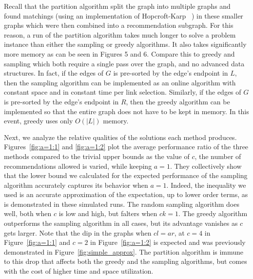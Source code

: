 Recall that the partition algorithm split the graph into multiple graphs
and found matchings (using an implementation of Hopcroft-Karp ~\cite{HopcroftKarp})
in these smaller graphs which were then combined into
a recommendation subgraph. For this reason, a run of the partition
algorithm takes much longer to solve a problem instance than either the
sampling or greedy algorithms. It also takes significantly more memory as can be seen in Figures 5 and 6.
Compare this to greedy and sampling which both require a single pass over
the graph, and no advanced data structures. In fact, if the edges
of $G$ is pre-sorted by the edge's endpoint in $L$, then the sampling algorithm can be
implemented as an online algorithm with constant space and in constant time
per link selection. Similarly, if the edges of $G$
is pre-sorted by the edge's endpoint in $R$, then the greedy algorithm can
be implemented so that the entire graph does not have to be kept in memory. In this
event, greedy uses only $O(|L|)$ memory. \vs

Next, we analyze the relative qualities of the solutions each method
produces.  Figures~\ref{fig:a=1:1} and \ref{fig:a=1:2} plot the
average performance ratio of the three methods compared to the trivial
upper bounds as the value of $c$, the number of recommendations
allowed is varied, while keeping $a = 1$.
They collectively show that the lower bound we calculated for the
expected performance of the sampling algorithm accurately captures its
behavior when $a=1$. Indeed, the inequality
we used is an accurate approximation of the expectation, up to lower
order terms, as is demonstrated in these simulated runs.  The random
sampling algorithm does well, both when $c$ is low and high, but
falters when $ck=1$. The greedy algorithm outperforms the
sampling algorithm in all cases, but its advantage vanishes as
$c$ gets larger. Note that the dip in the graphs when $cl=ar$, at
$c=4$ in Figure~\ref{fig:a=1:1} and $c=2$ in Figure~\ref{fig:a=1:2} is
expected and was previously demonstrated in
Figure~\ref{fig:simple_approx}.  The partition algorithm is immune to
this drop that affects both the greedy and the sampling algorithms,
but comes with the cost of higher time and space utilization.\vs

